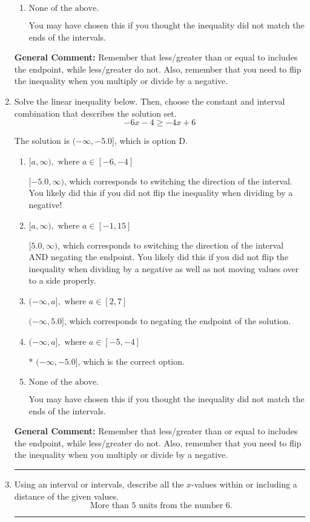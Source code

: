 \documentclass{extbook}[14pt]
\newcommand{\litem}[1]{\item #1

\rule{\textwidth}{0.4pt}}
\begin{document}
\begin{enumerate}
{\begin{enumerate}[label=\Alph*.]
 $(-\infty, 1.042]$, which corresponds to switching the direction of the interval. You likely did this if you did not flip the inequality when dividing by a negative!
\item \( \text{None of the above}. \)

You may have chosen this if you thought the inequality did not match the ends of the intervals.
\end{enumerate}

\textbf{General Comment:} Remember that less/greater than or equal to includes the endpoint, while less/greater do not. Also, remember that you need to flip the inequality when you multiply or divide by a negative.
}
\litem{
Solve the linear inequality below. Then, choose the constant and interval combination that describes the solution set.
\[ -6x -4 \geq -4x + 6 \]

The solution is \( (-\infty, -5.0] \), which is option D.\begin{enumerate}[label=\Alph*.]
\item \( [a, \infty), \text{ where } a \in [-6, -4] \)

 $[-5.0, \infty)$, which corresponds to switching the direction of the interval. You likely did this if you did not flip the inequality when dividing by a negative!
\item \( [a, \infty), \text{ where } a \in [-1, 15] \)

 $[5.0, \infty)$, which corresponds to switching the direction of the interval AND negating the endpoint. You likely did this if you did not flip the inequality when dividing by a negative as well as not moving values over to a side properly.
\item \( (-\infty, a], \text{ where } a \in [2, 7] \)

 $(-\infty, 5.0]$, which corresponds to negating the endpoint of the solution.
\item \( (-\infty, a], \text{ where } a \in [-5, -4] \)

* $(-\infty, -5.0]$, which is the correct option.
\item \( \text{None of the above}. \)

You may have chosen this if you thought the inequality did not match the ends of the intervals.
\end{enumerate}

\textbf{General Comment:} Remember that less/greater than or equal to includes the endpoint, while less/greater do not. Also, remember that you need to flip the inequality when you multiply or divide by a negative.
}
\litem{
Using an interval or intervals, describe all the $x$-values within or including a distance of the given values.
\[ \text{ More than } 5 \text{ units from the number } 6. \]

}
\end{enumerate}
\end{document}
